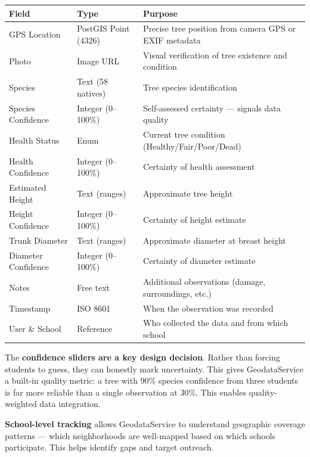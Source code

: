 \documentclass[11pt,a4paper]{article}
\begin{document}
\begin{center}
\small
\begin{tabularx}{\textwidth}{l l X}
\toprule
\textbf{Field} & \textbf{Type} & \textbf{Purpose} \\
\midrule
GPS Location & PostGIS Point (4326) & Precise tree position from camera GPS or EXIF metadata \\
Photo & Image URL & Visual verification of tree existence and condition \\
Species & Text (58 natives) & Tree species identification \\
Species Confidence & Integer (0--100\%) & Self-assessed certainty --- signals data quality \\
Health Status & Enum & Current tree condition (Healthy/Fair/Poor/Dead) \\
Health Confidence & Integer (0--100\%) & Certainty of health assessment \\
Estimated Height & Text (ranges) & Approximate tree height \\
Height Confidence & Integer (0--100\%) & Certainty of height estimate \\
Trunk Diameter & Text (ranges) & Approximate diameter at breast height \\
Diameter Confidence & Integer (0--100\%) & Certainty of diameter estimate \\
Notes & Free text & Additional observations (damage, surroundings, etc.) \\
Timestamp & ISO 8601 & When the observation was recorded \\
User \& School & Reference & Who collected the data and from which school \\
\bottomrule
\end{tabularx}
\end{center}

The \textbf{confidence sliders are a key design decision}. Rather than forcing students to guess, they can honestly mark uncertainty. This gives GeodataService a built-in quality metric: a tree with 90\% species confidence from three students is far more reliable than a single observation at 30\%. This enables quality-weighted data integration.

\textbf{School-level tracking} allows GeodataService to understand geographic coverage patterns --- which neighborhoods are well-mapped based on which schools participate. This helps identify gaps and target outreach.

\end{document}
